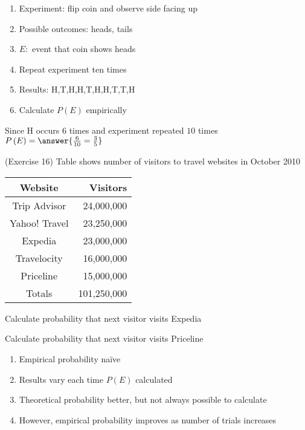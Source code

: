 \documentclass{ximera}
\begin{document}
\begin{question}
\begin{enumerate}
\item Experiment: flip coin and observe side facing up
\item Possible outcomes: heads, tails
\item $E:$ event that coin shows heads
\item Repeat experiment ten times
\item Results: H,T,H,H,T,H,H,T,T,H
\item Calculate $P\left(E\right)$ empirically
\end{enumerate}
\begin{solution} Since H occurs $6$ times
and experiment repeated $10$ times
$P\left(E\right)=\answer{\frac{6}{10}=\frac{3}{5}}$
\end{solution}
\end{question}

\begin{question}(Exercise 16)
Table shows number of visitors to travel websites in October 2010
\begin{center}\begin{tabular}{cr}
Website&Visitors\\\toprule
Trip Advisor&24,000,000\\
Yahoo! Travel&23,250,000\\
Expedia&23,000,000\\
Travelocity&16,000,000\\
Priceline&15,000,000\\\midrule
Totals&101,250,000
\end{tabular}\end{center}
\begin{parts}
\item Calculate probability that next visitor
visits Expedia
\begin{solution}\end{solution}
\item Calculate probability that next visitor
visits Priceline 
\begin{solution}\end{solution}
\end{parts}
\end{question}

\begin{remark}
\begin{enumerate}
\item Empirical probability na\"ive
\item Results vary each time $P\left(E\right)$ calculated
\item Theoretical probability better, but not always possible to calculate
\item However, empirical probability improves
as number of trials increases
\end{enumerate}
\end{remark}
\end{document}
